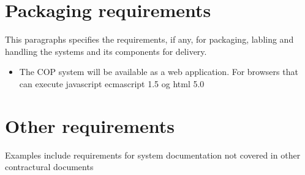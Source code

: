 

\section{Packaging requirements}
This paragraphs specifies the requirements, if any, for packaging, labling and handling the systems and its components for delivery.

\begin{itemize}
	\item The COP system will be available as a web application. For browsers that can execute javascript ecmascript 1.5 og html 5.0
\end{itemize}

\section{Other requirements}
Examples include requirements for system documentation
not covered in other contractural documents